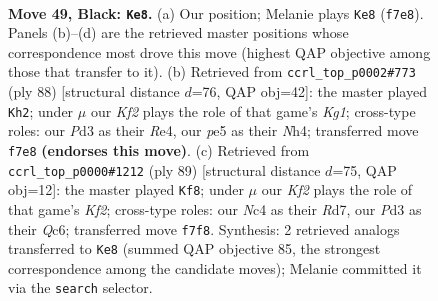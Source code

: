 \documentclass[11pt]{article}
\begin{document}
\clearpage

\begin{figure}[p]\centering
\begin{subfigure}{0.46\textwidth}\centering
\resizebox{\linewidth}{!}{%
\newchessgame
\chessboard[
  setfen={1qb5/r4k1Q/4p3/p2pPpB1/P1n4P/3p4/2R5/RN2N1K1 b - - 0 49},
  showmover=false,
  pgfstyle=straightmove, color=movearrow, markmove={f7-e8}
]}
\caption{}
\end{subfigure}\hfill
\begin{subfigure}{0.46\textwidth}\centering
\resizebox{\linewidth}{!}{%
\newchessgame
\chessboard[
  setfen={3r1k2/pp3b1Q/4pp2/1P1n1P2/3PR2N/P6P/6P1/2q3K1 w - - 7 45},
  showmover=false,
  pgfstyle=straightmove, color=movearrow, markmove={g1-h2}
]}
\caption{}
\end{subfigure}
\\[4pt]
\begin{subfigure}{0.46\textwidth}\centering
\resizebox{\linewidth}{!}{%
\newchessgame
\chessboard[
  setfen={8/1p1r1k2/2q1np1p/2PRp1pP/4P3/1Q2B3/5PPK/8 b - - 4 45},
  showmover=false,
  pgfstyle=straightmove, color=movearrow, markmove={f7-f8}
]}
\caption{}
\end{subfigure}\hfill

\caption{\textbf{Move 49, Black: \texttt{Ke8}.} (a) Our position; Melanie plays \texttt{Ke8} (\texttt{f7e8}). Panels (b)--(d) are the retrieved master positions whose correspondence most drove this move (highest QAP objective among those that transfer to it). (b) Retrieved from \texttt{ccrl\_top\_p0002\#773} (ply 88) [structural distance $d$=76, QAP obj=42]: the master played \texttt{Kh2}; under $\mu$ our \emph{Kf2} plays the role of that game's \emph{Kg1}; cross-type roles: our \emph{P}d3 as their \emph{R}e4, our \emph{p}e5 as their \emph{N}h4; transferred move \texttt{f7e8} \textbf{(endorses this move)}. (c) Retrieved from \texttt{ccrl\_top\_p0000\#1212} (ply 89) [structural distance $d$=75, QAP obj=12]: the master played \texttt{Kf8}; under $\mu$ our \emph{Kf2} plays the role of that game's \emph{Kf2}; cross-type roles: our \emph{N}c4 as their \emph{R}d7, our \emph{P}d3 as their \emph{Q}c6; transferred move \texttt{f7f8}. Synthesis: 2 retrieved analogs transferred to \texttt{Ke8} (summed QAP objective 85, the strongest correspondence among the candidate moves); Melanie committed it via the \texttt{search} selector.}
\label{fig:thought-m97}
\end{figure}

\clearpage
\end{document}
